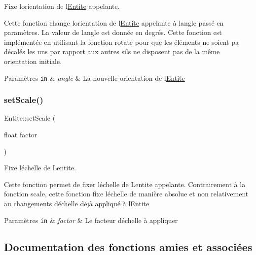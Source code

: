 Fixe l\textquotesingle{}orientation de l\textquotesingle{}\hyperlink{class_entite}{Entite} appelante. 

Cette fonction change l\textquotesingle{}orientation de l\textquotesingle{}\hyperlink{class_entite}{Entite} appelante à l\textquotesingle{}angle passé en paramètres. La valeur de l\textquotesingle{}angle est donnée en degrés. Cette fonction est implémentée en utilisant la fonction rotate pour que les éléments ne soient pa décalés les uns par rapport aux autres s\textquotesingle{}ils ne disposent pas de la même orientation initiale. 
\begin{DoxyParams}[1]{Paramètres}
\mbox{\tt in}  & {\em angle} & La nouvelle orientation de l\textquotesingle{}\hyperlink{class_entite}{Entite} \\
\hline
\end{DoxyParams}
\mbox{\label{class_entite_a665939253829baba965ce3ead0f1739c}} 
\subsubsection{\texorpdfstring{set\+Scale()}{setScale()}}
{\footnotesize\ttfamily Entite\+::set\+Scale (\begin{DoxyParamCaption}\item[{float}]{factor }\end{DoxyParamCaption})}



Fixe l\textquotesingle{}échelle de L\textquotesingle{}entite. 

Cette fonction permet de fixer l\textquotesingle{}échelle de L\textquotesingle{}entite appelante. Contrairement à la fonction scale, cette fonction fixe l\textquotesingle{}échelle de manière absolue et non relativement au changements d\textquotesingle{}échelle déjà appliqué à l\textquotesingle{}\hyperlink{class_entite}{Entite} 
\begin{DoxyParams}[1]{Paramètres}
\mbox{\tt in}  & {\em factor} & Le facteur d\textquotesingle{}échelle à appliquer \\
\hline
\end{DoxyParams}


\subsection{Documentation des fonctions amies et associées}
\mbox{\label{class_entite_ac5011435e5099909dd34cd1750933b30}} 

